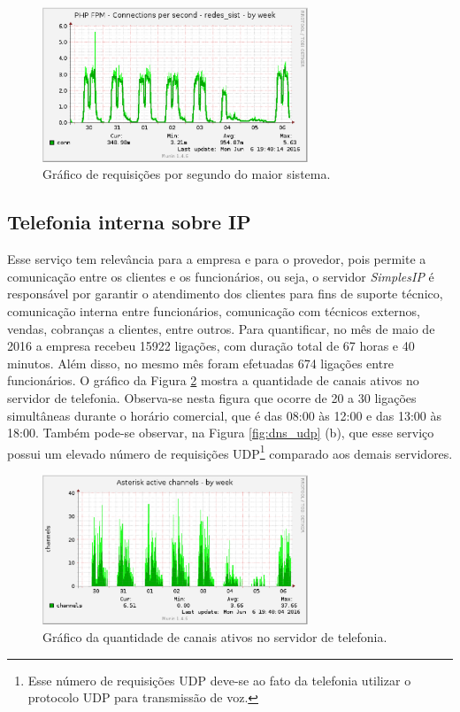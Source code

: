 
\begin{figure}[h!]
 \centering
 \includegraphics[width=300px]{img/soldi_week.eps}
 \caption{Gráfico de requisições por segundo do maior sistema.}
 \label{fig:soldi_week}
\end{figure}

\newpage
\subsection{Telefonia interna sobre IP}
\label{section:telefonia}

Esse serviço tem relevância para a empresa e para o provedor, pois permite a comunicação entre os clientes e os funcionários, ou seja, o 
servidor \textit{SimplesIP} é responsável por garantir o atendimento dos clientes para fins de suporte técnico, comunicação interna entre 
funcionários, comunicação com técnicos externos, vendas, cobranças a clientes, entre outros. Para quantificar, no mês de maio de 2016 a empresa 
recebeu 15922 ligações, com duração total de 67 horas e 40 minutos. Além disso, no mesmo mês foram efetuadas 674 ligações entre funcionários. 
O gráfico da Figura \ref{fig:simplesip_week} mostra a quantidade de canais ativos no servidor de telefonia. Observa-se nesta figura que ocorre 
de 20 a 30 ligações simultâneas durante o horário comercial, que é das 08:00 às 12:00 e das 13:00 às 18:00. Também pode-se observar, na Figura 
\ref{fig:dns_udp} (b), que esse serviço possui um elevado número de requisições \ac{UDP}\footnote[1]{Esse número de requisições \ac{UDP} 
deve-se ao fato da telefonia utilizar o protocolo \ac{UDP} para transmissão de voz.} comparado aos demais servidores.

\begin{figure}[h!]
 \centering
 \includegraphics[width=300px]{img/simplesip_week.eps}
 \caption{Gráfico da quantidade de canais ativos no servidor de telefonia.}
 \label{fig:simplesip_week}
\end{figure}

